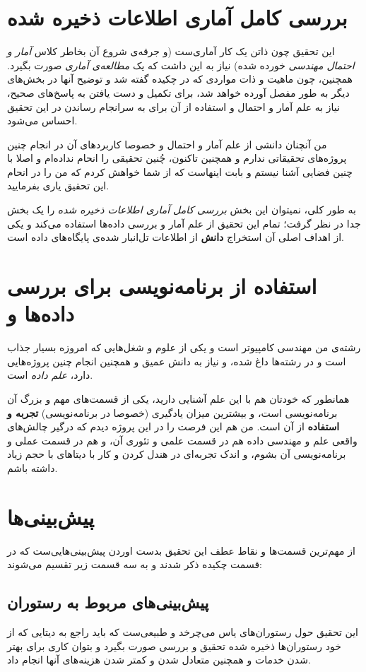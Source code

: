 \documentclass{article}
\begin{document}
	\section{بررسی کامل آماری اطلاعات ذخیره شده}
		این تحقیق چون ذاتن یک کار آماری‌ست (و جرقه‌ی شروع آن بخاطر کلاس \textit{آمار و احتمال مهندسی} خورده شده) نیاز به این داشت که یک \textit{مطالعه‌ی آماری} صورت بگیرد. همچنین، چون ماهیت و ذات مواردی که در چکیده گفته شد و توضیح آنها در بخش‌های دیگر به طور مفصل آورده‌ خواهد شد، برای تکمیل و دست یافتن به پاسخ‌های صحیح، نیاز به علم آمار و احتمال و استفاده از آن برای به سرانجام رساندن در این تحقیق احساس می‌شود.
		
		من آنچنان دانشی از علم آمار و احتمال و خصوصا کاربرد‌های آن در انجام چنین پروژه‌های تحقیقاتی ندارم و همچنین تاکنون، چُنین تحقیقی را انحام نداده‌ام و اصلا با چنین فضایی آشنا نیستم و بابت اینهاست که از شما خواهش کردم که من را در انحام این تحقیق یاری بفرمایید. 
		
		به طور کلی، نمیتوان این بخش \textit{بررسی کامل آماری اطلاعات ذخیره شده} را یک بخش جدا در نظر گرفت؛ تمام این تحقیق از علم آمار و بررسی داده‌ها استفاده می‌کند و یکی از اهداف اصلی‌‌‌ آن استخراج \textbf{دانش} از اطلاعات تل‌انبار شده‌ی پایگاه‌‌های داده است.
		
	\section{استفاده‌ از برنامه‌نویسی برای بررسی داده‌ها و }
		رشته‌ی من مهندسی کامپیوتر است و یکی از علوم و شغل‌‌هایی که امروزه بسیار جذاب است و در رشته‌ها داغ شده، و نیاز به دانش عمیق و همچنین انجام چنین پروژه‌‌هایی دارد، \textit{علم داده‌} است.
		
		همانطور که خودتان هم با این علم آشنایی دارید، یکی از قسمت‌‌های مهم و بزرگ‌ آن برنامه‌نویسی است، و بیشترین میزان یادگیری (خصوصا در برنامه‌نویسی) \textbf{تجربه و استفاده} از آن است. من هم این فرصت را در این پروژه دیدم که درگیر چالش‌های واقعی علم و مهندسی داده هم در قسمت علمی و تئوری آن، و هم در قسمت عملی و برنامه‌نویسی آن بشوم، و اندک تجربه‌ای در هندل کردن و کار با دیتا‌های با حجم زیاد داشته باشم.
	\section{پیش‌بینی‌ها}
	    از مهم‌ترین قسمت‌ها و نقاط عطف این تحقیق بدست اوردن پیش‌بینی‌هایی‌ست که در قسمت چکیده ذکر شدند و به سه قسمت زیر تقسیم می‌شوند:
	    \subsection{پیش‌بینی‌های مربوط به رستوران}
	    	این تحقیق حول رستوران‌‌های یاس می‌چرخد و طبیعی‌ست که باید راجع به دیتایی که از خود رستوران‌‌ها ذخیره شده تحقیق و بررسی صورت بگیرد و بتوان کاری برای بهتر شدن خدمات و همچنین متعادل شدن و کمتر شدن هزینه‌های آنها انجام داد.
	    	
\end{document}
